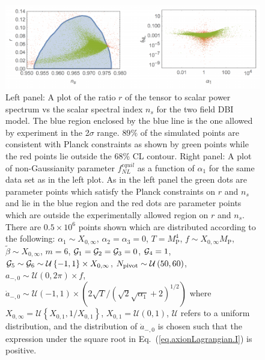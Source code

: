 \documentclass[a4paper,11pt]{article}
\begin{document}
  \begin{figure}
    \centering
    \includegraphics[width=1.0\textwidth]{figs/fig1.pdf}
    \caption{Left panel: A plot of the ratio $r$ of the tensor to scalar power spectrum vs the
      scalar spectral index $n_s$ for the two field DBI model.
      The blue region enclosed by the blue line is the one allowed by experiment in the 2$\sigma$
      range. $89\%$ of the simulated points are consistent with Planck constraints as shown by green
      points while the red points lie outside the 68\% CL contour.
          Right panel: A plot of non-Gaussianity parameter $f^{equil}_{NL}$ as
      a function of $\alpha_1$ for the same data set as in the left plot. As in the left panel
      the green dots are parameter points which satisfy the Planck constraints
      on $r$ and $n_s$ and lie in the blue region and the red dots are parameter points which are
      outside the experimentally allowed region on $r$ and $n_s$.
          There are $0.5 \times 10^6$ points shown which are distributed according to the following:
      $\alpha_1 \sim X_{0, \infty}$, $\alpha_2 = \alpha_3 = 0$,
      $T = M_\text{P}^4$,
      $f \sim X_{0, \infty} M_\text{P}$,
      $\tilde\beta \sim X_{0, \infty}$,
      $m = 6$, %
      ${\cal{G}}_1 = {\cal{G}}_2 = {\cal{G}}_3 = 0$, ${\cal{G}}_4 = 1$,
      ${\cal{G}}_5 \sim {\cal{G}}_6 \sim \mathcal{U}\left\{-1, 1\right\} \times X_{0, \infty}$,
      $N_{\rm pivot} \sim \mathcal{U}\left(50, 60\right)$,
      $a_{-, 0} \sim \mathcal{U}\left(0, 2\pi\right) \times f$,
      $\dot a_{-, 0} \sim \mathcal{U}\left(-1, 1\right)
          \times \left(2 \sqrt{T}/\left(\sqrt{2} \sqrt{\alpha_1} + 2\right)^{1/2}\right)$
      where $X_{0, \infty} = \mathcal{U}\left\{X_{0, 1}, 1 / X_{0, 1}\right\}$,
      $X_{0, 1} = \mathcal{U}\left(0, 1\right)$, $\mathcal{U}$ refers to a uniform distribution,
      and the distribution of $\dot a_{-, 0}$ is chosen such that the expression under the
      square root in Eq.~(\ref{eq.axionLagrangian.I}) is positive.}
    \label{fig1}
  \end{figure}
\end{document}
